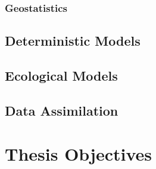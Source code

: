 \subsubsection{Geostatistics}

\subsection{Deterministic Models}
\subsection{Ecological Models}
\subsection{Data Assimilation}

\section{Thesis Objectives}
